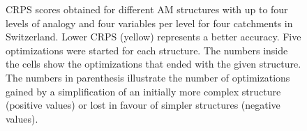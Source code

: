 \documentclass[draft]{agujournal2019}
\begin{document}
\begin{figure}[hbt]
	\noindent{}
	\caption{CRPS scores obtained for different AM structures with up to four levels of analogy and four variables per level for four catchments in Switzerland. Lower CRPS (yellow) represents a better accuracy. Five optimizations were started for each structure. The numbers inside the cells show the optimizations that ended with the given structure. The numbers in parenthesis illustrate the number of optimizations gained by a simplification of an initially more complex structure (positive values) or lost in favour of simpler structures (negative values).}
	\label{fig_structures_a}
\end{figure}
\end{document}
